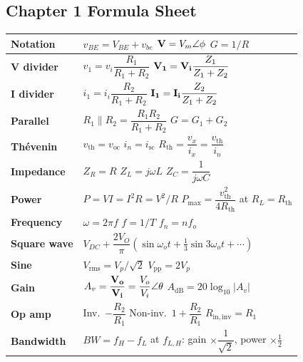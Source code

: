     \subsection[1.F]{Chapter 1 Formula Sheet}
    \renewcommand{\arraystretch}{1.6}
    \begin{tabularx}{\linewidth}{|>{\bfseries}l|L|}
        \hline
        Notation & $v_{BE} = V_{BE} + v_{be}$ \quad $\mathbf{V} = V_m\angle\phi$ \quad $G = 1/R$ \\ \hline
        V divider & $v_1 = v_i\dfrac{R_1}{R_1+R_2}$ \quad $\mathbf{V_1} = \mathbf{V_i}\dfrac{Z_1}{Z_1+Z_2}$ \\ \hline
        I divider & $i_1 = i_i\dfrac{R_2}{R_1+R_2}$ \quad $\mathbf{I_1} = \mathbf{I_i}\dfrac{Z_2}{Z_1+Z_2}$ \\ \hline
        Parallel & $R_1\|R_2 = \dfrac{R_1R_2}{R_1+R_2}$ \quad $G = G_1 + G_2$ \\ \hline
        Th\'evenin & $v_{\mathrm{th}} = v_{\mathrm{oc}}$ \quad $i_n = i_{\mathrm{sc}}$ \quad $R_{\mathrm{th}} = \dfrac{v_x}{i_x} = \dfrac{v_{\mathrm{th}}}{i_n}$ \\ \hline
        Impedance & $Z_R = R$ \quad $Z_L = j\omega L$ \quad $Z_C = \dfrac{1}{j\omega C}$ \\ \hline
        Power & $P = VI = I^2R = V^2/R$ \quad $P_{\mathrm{max}} = \dfrac{v_{\mathrm{th}}^2}{4R_{\mathrm{th}}}$ at $R_L = R_{\mathrm{th}}$ \\ \hline
        Frequency & $\omega = 2\pi f$ \quad $f = 1/T$ \quad $f_n = n f_o$ \\ \hline
        Square wave & $V_{DC} + \dfrac{2V_O}{\pi}\left(\sin\omega_o t + \frac13\sin3\omega_o t + \cdots\right)$ \\ \hline
        Sine & $V_{\mathrm{rms}} = V_p/\sqrt2$ \quad $V_{\mathrm{pp}} = 2V_p$ \\ \hline
        Gain & $A_v = \dfrac{\mathbf{V_o}}{\mathbf{V_i}} = \dfrac{V_o}{V_i}\angle\theta$ \quad $A_{\mathrm{dB}} = 20\log_{10}|A_v|$ \\ \hline
        Op amp & Inv.\ $-\dfrac{R_2}{R_1}$ \quad Non-inv.\ $1 + \dfrac{R_2}{R_1}$ \quad $R_{\mathrm{in,inv}} = R_1$ \\ \hline
        Bandwidth & $BW = f_H - f_L$ \quad at $f_{L,H}$: gain $\times\dfrac{1}{\sqrt2}$, power $\times\frac12$ \\ \hline
    \end{tabularx}
    \renewcommand{\arraystretch}{1.05}

